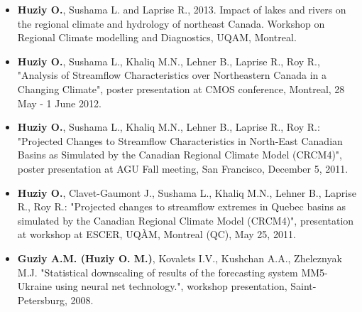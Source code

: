 {\begin{itemize}
   \item \textbf{Huziy O.}, Sushama L. and Laprise R., 2013. Impact of lakes
   and rivers on the regional climate and hydrology of northeast Canada.
   Workshop on Regional Climate modelling and Diagnostics, UQAM, Montreal.

    \item \textbf{Huziy O.}, Sushama L., Khaliq M.N., Lehner B., Laprise R., Roy
    R., "Analysis of Streamflow Characteristics over Northeastern Canada in a
    Changing Climate", poster presentation at CMOS conference, Montreal, 28 May -
    1 June 2012.

    \item \textbf{Huziy O.}, Sushama L., Khaliq M.N., Lehner B., Laprise R., Roy
    R.: "Projected Changes to Streamflow Characteristics in North-East Canadian
    Basins as Simulated by the Canadian Regional Climate Model (CRCM4)", poster
    presentation at AGU Fall meeting, San Francisco, December 5, 2011.

    \item \textbf{Huziy O.}, Clavet-Gaumont J., Sushama L., Khaliq M.N., Lehner
    B., Laprise R., Roy R.: "Projected changes to streamflow extremes in Quebec
    basins as simulated by the Canadian Regional Climate Model (CRCM4)",
    presentation at workshop at ESCER, UQÀM, Montreal (QC), May 25, 2011.

    \item \textbf{Guziy A.M. (Huziy O. M.)}, Kovalets I.V., Kushchan A.A.,
    Zheleznyak M.J.
    "Statistical downscaling of results of the forecasting system MM5-Ukraine using neural net technology.",
    workshop presentation, Saint-Petersburg, 2008.

\end{itemize}
}
